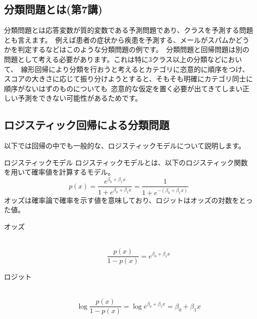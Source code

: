 \documentclass[uplatex]{jsarticle}
\begin{document}
\subsection{分類問題とは(第7講)}
分類問題とは応答変数が質的変数である予測問題であり、クラスを予測する問題とも言えます。\
例えば患者の症状から疾患を予測する、メールがスパムかどうかを判定するなどはこのような分類問題の例です。\
分類問題と回帰問題は別の問題として考える必要があります。これは特に3クラス以上の分類などにおいて、\
線形回帰により分類を行おうと考えるとカテゴリに恣意的に順序をつけ、スコアの大きさに応じて振り分けようとすると、そもそも明確にカテゴリ同士に順序がないはずのものについても\
恣意的な仮定を置く必要が出てきてしまい正しい予測をできない可能性があるためです。

\subsection{ロジスティック回帰による分類問題}
以下では回帰の中でも一般的な、ロジスティックモデルについて説明します。
\begin{itembox}[l]{ロジスティックモデル}
  ロジスティックモデルとは、以下のロジスティック関数を用いて確率値を計算するモデル。
  $$p(x) = \frac{e^{\beta_0 + \beta_1x}}{1 + e^{\beta_0 + \beta_1x}} = \frac{1}{1 + e^{-(\beta_0 + \beta_1x)}}$$
  オッズは確率論で確率を示す値を意味しており、ロジットはオッズの対数をとった値。
  \begin{description}
    \item[オッズ]\mbox{}\\
    $$\frac{p(x)}{1 - p(x)} = e^{\beta_0 + \beta_1 x}$$
    \item[ロジット]\mbox{}\\
    $$\log{\frac{p(x)}{1 - p(x)}} = \log{e^{\beta_0 + \beta_1 x}} = \beta_0 + \beta_1 x$$
  \end{description}
\end{itembox}
\end{document}
